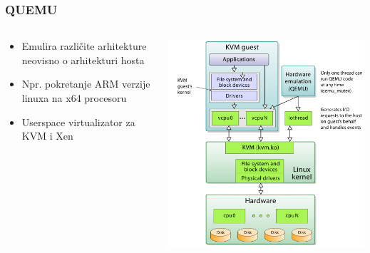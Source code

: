 \documentclass[t]{beamer}
\begin{document}
\begin{frame}
	\frametitle{QUEMU}
	\begin{columns}[T]
	\begin{column}{0.5\textwidth}
		\begin{itemize}
      \item Emulira različite arhitekture neovisno o arhitekturi hosta
      \item Npr. pokretanje ARM verzije linuxa na x64 procesoru
      \item Userspace virtualizator za KVM i Xen
		\end{itemize}
	\end{column}
	\begin{column}{0.5\textwidth}
		\includegraphics[width=\textwidth]{kvm.png}
	\end{column}
	\end{columns}
\end{frame}
\end{document}
